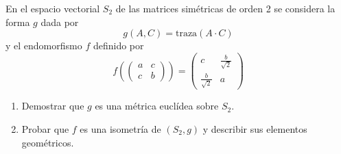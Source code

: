 \documentclass[12pt]{article}
\begin{document}
	\begin{ejercicio}[4 puntos]
		En el espacio vectorial \( S_2 \) de las matrices simétricas de orden 2 se considera la forma \( g \) dada por
		\[
		g(A, C) = \mathrm{traza}(A \cdot C)
		\]
		y el endomorfismo \( f \) definido por
		\[
		f\left( \begin{pmatrix} a & c \\ c & b \end{pmatrix} \right)
		= \begin{pmatrix} c & \frac{b}{\sqrt{2}} \\ \frac{b}{\sqrt{2}} & a \end{pmatrix}
		\]
		\begin{enumerate}
			\item Demostrar que \( g \) es una métrica euclídea sobre \( S_2 \).
			\item Probar que \( f \) es una isometría de \( (S_2, g) \) y describir sus elementos geométricos.
		\end{enumerate}
	\end{ejercicio}
\end{document}
